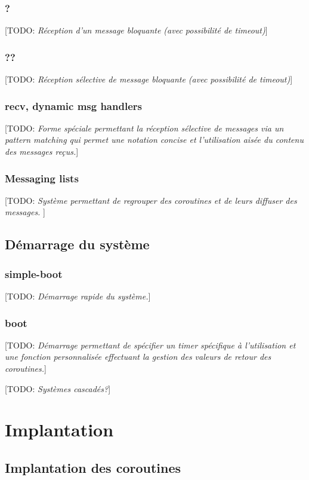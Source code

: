 \documentclass[12pt,oneside,letterpaper,francais]{book}
\newcommand{\todo}[1]{[TODO: {\it #1}]}
\begin{document}
\subsubsection{?}
\todo{Réception d'un message bloquante (avec possibilité de timeout)}

\subsubsection{??}
\todo{Réception sélective de message bloquante (avec possibilité de timeout)}

\subsubsection{recv, dynamic msg handlers}
\todo{Forme spéciale permettant la réception sélective de messages via
  un \og pattern matching \fg qui permet une notation concise et
  l'utilisation aisée du contenu des messages reçus.}

\subsubsection{Messaging lists}
\todo{Système permettant de regrouper des coroutines et de leurs
  diffuser des messages. }

\subsection{Démarrage du système}
\subsubsection{simple-boot}
\todo{Démarrage rapide du système.}

\subsubsection{boot}
\todo{Démarrage permettant de spécifier un timer spécifique à
  l'utilisation et une fonction personnalisée effectuant la gestion
  des valeurs de retour des coroutines.}

\todo{Systèmes cascadés?}


\section{Implantation}

\subsection{Implantation des coroutines}
\end{document}
